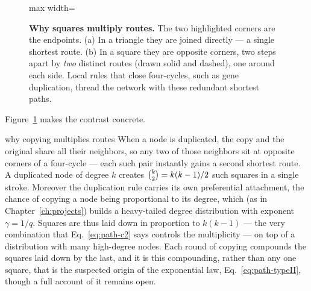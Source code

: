 \begin{figure}[t]
\centering
\begin{adjustbox}{max width=\linewidth}\end{adjustbox}
\caption{\textbf{Why squares multiply routes.} The two highlighted corners are the
endpoints. (a) In a triangle they are joined directly --- a single shortest route.
(b) In a square they are opposite corners, two steps apart by \emph{two} distinct
routes (drawn solid and dashed), one around each side. Local rules that close
four-cycles, such as gene
duplication, thread the network with these redundant shortest paths.}
\label{fig:path-square}
\end{figure}

Figure~\ref{fig:path-square} makes the contrast concrete.

\begin{calculation}{why copying multiplies routes}
When a node is duplicated, the copy and the original share all their neighbors,
so any two of those neighbors sit at opposite corners of a four-cycle --- each
such pair instantly gains a second shortest route. A duplicated node of degree
$k$ creates $\tbinom{k}{2}=k(k-1)/2$ such squares in a single stroke. Moreover the
duplication rule carries its own preferential attachment, the chance of copying a
node being proportional to its degree, which (as in Chapter~\ref{ch:projects})
builds a heavy-tailed degree distribution with exponent $\gamma=1/q$. Squares are
thus laid down in proportion to $k(k-1)$ --- the very combination that
Eq.~\eqref{eq:path-c2} says controls the multiplicity --- on top of a distribution
with many high-degree nodes. Each round of copying compounds the squares laid down
by the last, and it is this compounding, rather than any one square, that is the
suspected origin of the exponential law, Eq.~\eqref{eq:path-typeII}, though a full
account of it remains open.
\end{calculation}

